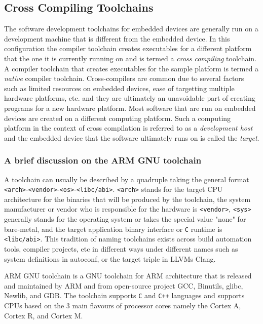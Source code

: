 \subsection{Cross Compiling Toolchains}

The software development toolchains for embedded devices are generally run on a development machine that is different from the embedded device. In this configuration the compiler toolchain creates executables for a different platform that the one it is currently running on and is termed a \textit{cross compiling} toolchain. A compiler toolchain that creates executables for the sample platform is termed a \textit{native} compiler toolchain. Cross-compilers are common due to several factors such as limited resources on embedded devices, ease of targetting multiple hardware platforms, etc. and they are ultimately an unavoidable part of creating programs for a new hardware platform. Most software that are run on embedded devices are created on a different computing platform. Such a computing platform in the context of cross compilation is referred to as a \textit{development host} and the embedded device that the software ultimately runs on is called the \textit{target}.

\subsubsection{A brief discussion on the ARM GNU toolchain}


A toolchain can usually be described by a quadruple taking the general format \texttt{<arch>}-\texttt{<vendor>}-\texttt{<os>}-\texttt{<libc/abi>}. \texttt{<arch>} stands for the target CPU architecture for the binaries that will be produced by the toolchain, the system manufacturer or vendor who is responsible for the hardware is \texttt{<vendor>}, \texttt{<sys>} generally stands for the operating system or takes the special value "none" for bare-metal, and the target application binary interface or \texttt{C} runtime is \texttt{<libc/abi>}. This tradition of naming toolchains exists across build automation tools, compiler projects, etc in different ways under different names such as system definitions in autoconf, or the target triple in LLVM\textquotesingle s Clang.

ARM GNU toolchain is a GNU toolchain for ARM architecture that is released and maintained by ARM and from open-source project GCC, Binutils, glibc, Newlib, and GDB. The toolchain supports \texttt{C} and \texttt{C++} languages and supports CPUs based on the 3 main flavours of processor cores namely the Cortex A, Cortex R, and Cortex M.

